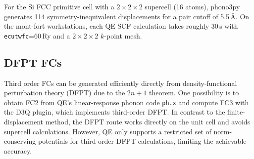For the Si FCC primitive cell with a $2\times2\times2$ supercell
(16 atoms), phono3py generates 114 symmetry-inequivalent displacements
for a pair cutoff of 5.5\,\AA.  On the mont-fort workstations, each QE SCF
calculation takes roughly 30\,s  with
\texttt{ecutwfc}=60\,Ry and a $2\times2\times2$ $k$-point mesh.

\subsection{DFPT FCs}
\label{sec:dfpt}

Third order FCs can be generated efficiently directly from density-functional
perturbation theory (DFPT) due to the $2n+1$ theorem.  One possibility is to obtain FC2 from QE's linear-response phonon code \texttt{ph.x} and compute FC3 with the D3Q plugin,
which implements third-order DFPT.  In contrast to the
finite-displacement method, the DFPT route works directly on the unit
cell and avoids supercell calculations. However, QE only supports a restricted set of
norm-conserving potentials for third-order DFPT calculations, limiting the achievable accuracy.

